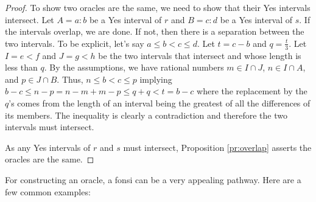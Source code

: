 \documentclass[12pt]{article}
\theoremstyle{remark}
\begin{document}
\begin{proof}
To show two oracles are the same, we need to show that their Yes intervals intersect. Let $A=a:b$ be a Yes interval of $r$ and $B=c:d$ be a Yes interval of $s$. If the intervals overlap, we are done. If not, then there is a separation between the two intervals. To be explicit, let's say $a \leq b < c \leq d$. Let $t = c-b$ and $q = \frac{t}{3}$. Let $I= e\lt f$ and $J= g \lt h$ be the two intervals that intersect and whose length is less than $q$. By the assumptions, we have rational numbers $m \in I \cap J$, $n \in I \cap A$, and $p \in J \cap B$. Thus,  $n \leq b < c \leq p$ implying $b -c \leq n - p  = n-m + m-p \leq q + q < t = b-c$ where the replacement by the $q$'s comes from the length of an interval being the greatest of all the differences of its members. The inequality is clearly a contradiction and therefore the two intervals must intersect. 
 
As any Yes intervals of $r$ and $s$ must intersect, Proposition \ref{pr:overlap} asserts the oracles are the same.  
\end{proof}

For constructing an oracle, a fonsi can be a very appealing pathway. Here are a few common examples: 
\end{document}
